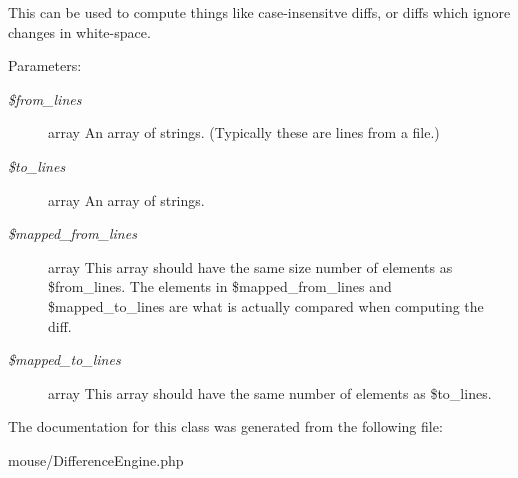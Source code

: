 This can be used to compute things like case-insensitve diffs, or diffs which ignore changes in white-space.

\begin{Desc}
\item[Parameters:]
\begin{description}
\item[{\em \$from\_\-lines}]array An array of strings. (Typically these are lines from a file.)\item[{\em \$to\_\-lines}]array An array of strings.\item[{\em \$mapped\_\-from\_\-lines}]array This array should have the same size number of elements as \$from\_\-lines. The elements in \$mapped\_\-from\_\-lines and \$mapped\_\-to\_\-lines are what is actually compared when computing the diff.\item[{\em \$mapped\_\-to\_\-lines}]array This array should have the same number of elements as \$to\_\-lines. \end{description}
\end{Desc}


The documentation for this class was generated from the following file:\begin{CompactItemize}
\item 
mouse/DifferenceEngine.php\end{CompactItemize}
